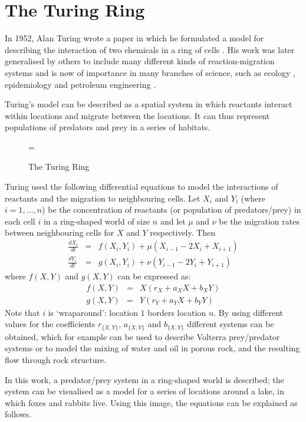 \section{The Turing Ring}
\label{sTuringRing}
In 1952, Alan Turing wrote a paper in which he formulated a model
for describing the interaction of two chemicals in a ring of cells
\cite{Tur52}. His
work was later generalised by others to include many different kinds of
reaction-migration systems and is now of importance in many branches
of science, such as ecology \cite{Smith91}, epidemiology
\cite{Moll77} and petroleum engineering \cite{Whee88}.

Turing's model can be described as a spatial system in
which reactants interact within locations and migrate between the
locations. It can thus represent populations of predators and prey in
a series of habitats.

\begin{figure}
\epsfxsize=\textwidth
{}
\caption{The Turing Ring}
\label{fTuringRing}
\end{figure}

Turing used the following differential equations to model the
interactions of reactants and the migration to neighbouring cells.  Let
$X_i$ and $Y_i$ (where $i = 1, \ldots , n$) be the concentration of
reactants (or population of predators/prey) in each cell $i$ in a
ring-shaped world of size $n$ and let $\mu$ and $\nu$ be the migration
rates between neighbouring cells for $X$ and $Y$ respectively. Then
\begin{eqnarray}
	\frac{dX_i}{dt} & = & f(X_i, Y_i) + \mu(X_{i-1} -
		2X_i + X_{i+1}) \label{migrX} \\
	\frac{dY_i}{dt} & = & g(X_i, Y_i) + \nu(Y_{i-1} -
		2Y_i + Y_{i+1}) \label{migrY}
\end{eqnarray}
where $f(X, Y)$ and $g(X, Y)$ can be expressed as:
\begin{eqnarray}
	f(X, Y) & = & X(r_X + a_XX + b_XY) \\
	g(X, Y) & = & Y(r_Y + a_YX + b_YY)
\end{eqnarray}
Note that $i$ is `wraparound':  location $1$ borders location $n$.  By
using different values for the coefficients
$r_{\{X, Y\}}$, $a_{\{X, Y\}}$ and $b_{\{X, Y\}}$
different systems can be obtained, which for example 
can be used to describe
Volterra prey/predator systems or to model the mixing of water and oil
in porous rock, and the resulting flow through rock structure.

In this work, a predator/prey system in a ring-shaped world is
described; the system can be visualised as a model for a series of
locations around a
lake, in which foxes and rabbits live. Using this image, the equations
can be explained as follows.

